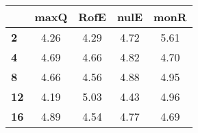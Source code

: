 \begin{tabular}{|l|c|c|c|c|}
\hline
&\textbf{maxQ}&\textbf{RofE}&\textbf{nulE}&\textbf{monR}\\\hline
\textbf{2}&4.26&4.29&4.72&5.61\\\hline
\textbf{4}&4.69&4.66&4.82&4.70\\\hline
\textbf{8}&4.66&4.56&4.88&4.95\\\hline
\textbf{12}&4.19&5.03&4.43&4.96\\\hline
\textbf{16}&4.89&4.54&4.77&4.69\\\hline
\end{tabular}
